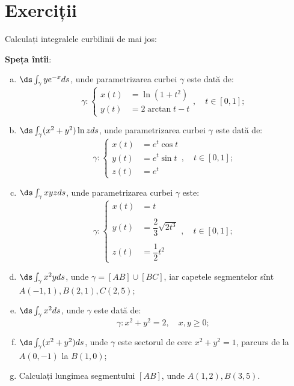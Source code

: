 \section{Exerciții}

Calculați integralele curbilinii de mai jos:

\textbf{Speța întîi}:
\begin{enumerate}[(a)]
    \item $ \ds\int_\gamma ye^{-x} ds $, unde parametrizarea curbei $ \gamma $
        este dată de:
        \[
              \gamma : %
              \begin{cases}
                  x(t) &= \ln(1 + t^2) \\
                  y(t) &= 2 \arctan t - t
              \end{cases}, \quad t \in [0, 1];
        \]
    \item $ \ds\int_\gamma (x^2 + y^2) \ln z ds $, unde parametrizarea curbei
        $ \gamma $ este dată de:
        \[
              \gamma : %
              \begin{cases}
                  x(t) &= e^t \cos t \\
                  y(t) &= e^t \sin t \\
                  z(t) &= e^t
              \end{cases}, \quad t \in [0, 1];
        \]
    \item $ \ds\int_\gamma xyz ds $, unde parametrizarea curbei $ \gamma $ este:
        \[
              \gamma : %
              \begin{cases}
                  x(t) &= t \\
                       & \\
                  y(t) &= \dfrac{2}{3}\sqrt{2t^3} \\
                       & \\
                  z(t) &= \dfrac{1}{2} t^2
              \end{cases}, \quad t \in [0, 1];
        \]
    \item $ \ds\int_\gamma x^2y ds $, unde $ \gamma = [AB] \cup [BC] $,
        iar capetele segmentelor sînt $ A(-1, 1), B(2, 1), C(2, 5) $;
    \item $ \ds\int_\gamma x^2 ds $, unde $ \gamma $ este dată de:
        \[
              \gamma : x^2 + y^2 = 2, \quad x, y \geq 0;
        \]
    \item $ \ds\int_\gamma (x^2 + y^2) ds $, unde $ \gamma $ este sectorul
        de cerc $ x^2 + y^2 = 1 $, parcurs de la $ A(0, -1) $ la $ B(1, 0) $;
    \item Calculați lungimea segmentului $ [AB] $, unde $ A(1, 2), B(3, 5) $.
\end{enumerate}

